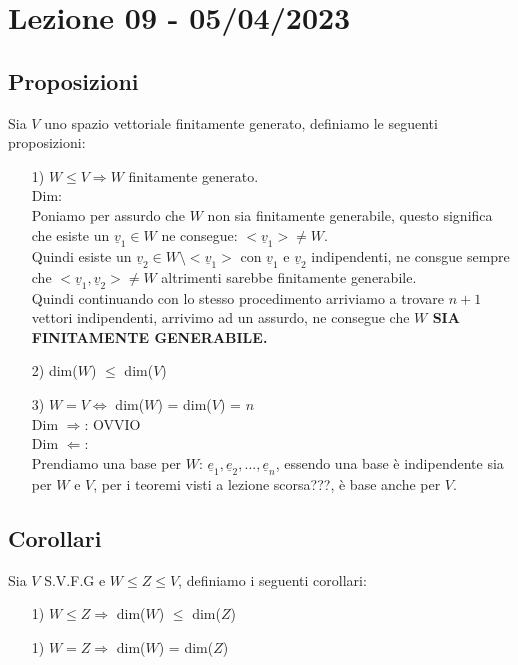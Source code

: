 \section{Lezione 09 - 05/04/2023}

\subsection{Proposizioni}
Sia $V$ uno spazio vettoriale finitamente generato, definiamo le seguenti proposizioni:
\begin{itemize}
\item[1)] $W \le V \Rightarrow W$ finitamente generato.\\
Dim:\\
Poniamo per assurdo che $W$ non sia finitamente generabile, questo significa che esiste un $\underline{v}_1 \in W$ ne consegue: $<\underline{v}_1> \neq W$.\\
Quindi esiste un $\underline{v}_2 \in W \setminus <\underline{v}_1>$ con $\underline{v}_1$ e $\underline{v}_2$ indipendenti, ne consgue sempre che $<\underline{v}_1, \underline{v}_2> \neq W$ altrimenti sarebbe finitamente generabile.\\
Quindi continuando con lo stesso procedimento arriviamo a trovare $n+1$ vettori indipendenti, arrivimo ad un assurdo, ne consegue che \textbf{$W$ SIA FINITAMENTE GENERABILE.}

\item[2)] dim($W$) $\le$ dim($V$)

\item[3)] $W = V \Leftrightarrow$ dim($W$) = dim($V$) = $n$\\
Dim $\Rightarrow$: OVVIO\\
Dim $\Leftarrow$:\\
Prendiamo una base per $W$: $\underline{e}_1, \underline{e}_2,...,\underline{e}_n$, essendo una base è indipendente sia per $W$ e $V$, per i teoremi visti a lezione scorsa???, è base anche per $V$.
\end{itemize}


\subsection{Corollari}
Sia $V$ S.V.F.G e $W \le Z \le V$, definiamo i seguenti corollari:
\begin{itemize}
\item[1)] $W \le Z \Rightarrow$ dim($W$) $\le$ dim($Z$)
\item[1)] $W = Z \Rightarrow$ dim($W$) = dim($Z$)
\end{itemize}

